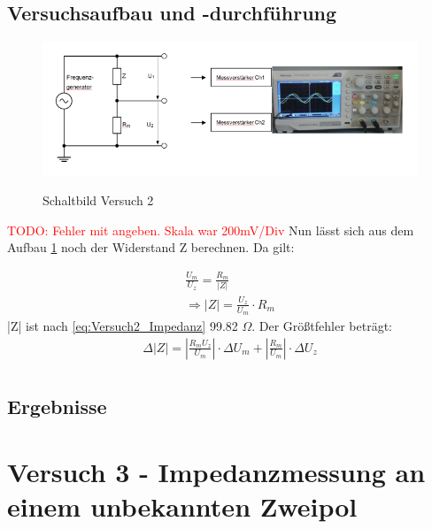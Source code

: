     \subsection{Versuchsaufbau und -durchführung}
    \begin{figure}[H]
        \centering
        \caption{Schaltbild Versuch 2}
        \includegraphics[width=\textwidth]{bilder/Versuch2_Aufbau.png}
        \label{fig:Versuch2_Schaltbild}
    \end{figure}

    \textcolor{red}{TODO: Fehler mit angeben. Skala war 200mV/Div}
    Nun lässt sich aus dem Aufbau \ref{fig:Versuch2_Schaltbild} noch der Widerstand Z berechnen. Da gilt: 

    \begin{equation}
        \begin{aligned}
            \frac{U_m}{U_z} = \frac{R_m}{|Z|} \\
            \Rightarrow |Z| = \frac{U_z}{U_m} \cdot R_m
            \label{eq:Versuch2_Impedanz}
        \end{aligned}
    \end{equation}
    |Z| ist nach \ref{eq:Versuch2_Impedanz} 99.82 $\Omega$. Der Größtfehler beträgt:
    \begin{equation}
        \begin{aligned}
            \Delta |Z| = \left |\frac{R_mU_z}{U_m} \right | \cdot \Delta U_m + \left |\frac{R_m}{U_m} \right | \cdot \Delta U_z \\
            \label{eq:Versuch2_Impedanz_Fehler}
        \end{aligned}
    \end{equation}
    \subsection{Ergebnisse}


\section{Versuch 3 - Impedanzmessung an einem unbekannten Zweipol}
    
